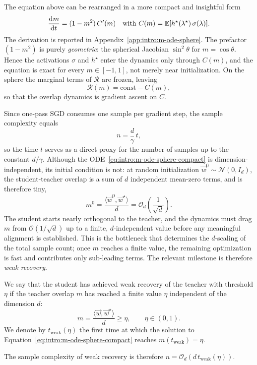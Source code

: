 The equation above can be rearranged in a more compact and insightful form
\begin{equation} \label{eq:intro:m-ode-sphere-compact}
    \dod{m}{t} = (1 - m^2)\,C'(m) \quad \text{with } C(m) = \mathbb{E}[h^\star(\lambda^\star)\,\sigma(\lambda)].
\end{equation}
The derivation is reported in Appendix~\ref{app:intro:m-ode-sphere}. The prefactor \((1 - m^2)\) is purely \emph{geometric}: the spherical Jacobian \(\sin^2\theta\) for \(m = \cos\theta\). Hence the activations \(\sigma\) and \(h^\star\) enter the dynamics only through \(C(m)\), and the equation is exact for every \(m \in [-1, 1]\), not merely near initialization. On the sphere the marginal terms of \(\mathcal{R}\) are frozen, leaving
\begin{equation} \label{eq:intro:correlation-potential}
    \mathcal{R}(m) = \mathrm{const} - C(m),
\end{equation}
so that the overlap dynamics is gradient ascent on \(C\).

Since one-pass SGD consumes one sample per gradient step, the sample complexity equals
\[n = \frac{d}{\gamma}\,t,\]
so the time \(t\) serves as a direct proxy for the number of samples up to the constant \(d/\gamma\).
Although the ODE~\eqref{eq:intro:m-ode-sphere-compact} is dimension-independent, its initial condition is not: at random initialization \(\vec{w}^0 \sim \mathcal{N}(0, I_d)\), the student-teacher overlap is a sum of \(d\) independent mean-zero terms, and is therefore tiny,
\[m^0 = \frac{\langle \vec{w}^0, \vec{w}^\star \rangle}{d} = \mathcal{O}_d\!\left(\frac{1}{\sqrt{d}}\right).\]
The student starts nearly orthogonal to the teacher, and the dynamics must drag \(m\) from \(\mathcal{O}(1/\sqrt{d})\) up to a finite, \(d\)-independent value before any meaningful alignment is established. This is the bottleneck that determines the \(d\)-scaling of the total sample count; once \(m\) reaches a finite value, the remaining optimization is fast and contributes only sub-leading terms. The relevant milestone is therefore \emph{weak recovery}.
\begin{definition}
    We say that the student has achieved weak recovery of the teacher with threshold \(\eta\) if the teacher overlap \(m\) has reached a finite value \(\eta\) independent of the dimension \(d\):
    \begin{equation}
    \label{eq:intro:weak-recovery}
        m = \frac{\langle \vec{w}, \vec{w}^\star \rangle}{d} \geq \eta, \qquad \eta \in (0, 1).
    \end{equation}
    We denote by \(t_\text{weak}(\eta)\) the first time at which the solution to Equation~\eqref{eq:intro:m-ode-sphere-compact} reaches \(m(t_\text{weak}) = \eta\).
\end{definition}
The sample complexity of weak recovery is therefore \(n = \mathcal{O}_d(d\,t_\text{weak}(\eta))\).

